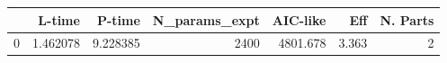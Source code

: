 \begin{tabular}{lrrrrrr}
\toprule
{} &    L-time &    P-time &  N\_params\_expt &  AIC-like &    Eff &  N. Parts \\
\midrule
0 &  1.462078 &  9.228385 &           2400 &  4801.678 &  3.363 &         2 \\
\bottomrule
\end{tabular}
